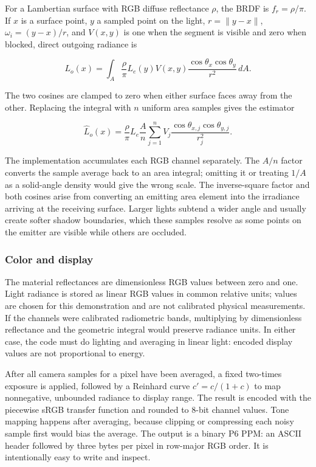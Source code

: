 For a Lambertian surface with RGB diffuse reflectance \(\rho\), the BRDF is \(f_r=\rho/\pi\). If \(x\) is a surface point, \(y\) a sampled point on the light, \(r=\|y-x\|\), \(\omega_i=(y-x)/r\), and \(V(x,y)\) is one when the segment is visible and zero when blocked, direct outgoing radiance is

\[
L_o(x)=\int_A \frac{\rho}{\pi} L_e(y) V(x,y)
\frac{\cos\theta_x\cos\theta_y}{r^2}\,dA.
\]

The two cosines are clamped to zero when either surface faces away from the other. Replacing the integral with \(n\) uniform area samples gives the estimator

\[
\widehat L_o(x)=\frac{\rho}{\pi}L_e\frac{A}{n}
\sum_{j=1}^{n} V_j\frac{\cos\theta_{x,j}\cos\theta_{y,j}}{r_j^2}.
\]

The implementation accumulates each RGB channel separately. The \(A/n\) factor converts the sample average back to an area integral; omitting it or treating \(1/A\) as a solid-angle density would give the wrong scale. The inverse-square factor and both cosines arise from converting an emitting area element into the irradiance arriving at the receiving surface. Larger lights subtend a wider angle and usually create softer shadow boundaries, which these samples resolve as some points on the emitter are visible while others are occluded.

\subsubsection{Color and display}\label{04-visual-computing-ii-ch035-color-and-display}

\hypertarget{04-visual-computing-ii-ch035-color-and-display}{}

The material reflectances are dimensionless RGB values between zero and one. Light radiance is stored as linear RGB values in common relative units; values are chosen for this demonstration and are not calibrated physical measurements. If the channels were calibrated radiometric bands, multiplying by dimensionless reflectance and the geometric integral would preserve radiance units. In either case, the code must do lighting and averaging in linear light: encoded display values are not proportional to energy.

After all camera samples for a pixel have been averaged, a fixed two-times exposure is applied, followed by a Reinhard curve \(c'=c/(1+c)\) to map nonnegative, unbounded radiance to display range. The result is encoded with the piecewise sRGB transfer function and rounded to 8-bit channel values. Tone mapping happens after averaging, because clipping or compressing each noisy sample first would bias the average. The output is a binary P6 PPM: an ASCII header followed by three bytes per pixel in row-major RGB order. It is intentionally easy to write and inspect.

